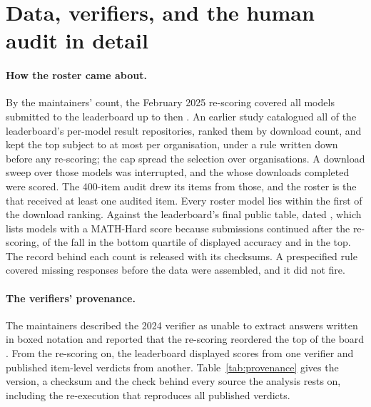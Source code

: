 \section{Data, verifiers, and the human audit in detail}
\label{app:data}

\paragraph{How the roster came about.}
By the maintainers' count, the February 2025 re-scoring covered all \BoardModelsRescored{} models
submitted to the leaderboard up to then \citep{kydlicek2025fixing}. An earlier study catalogued all \RosterCatalogued{} of the
leaderboard's per-model result repositories, ranked them by download count, and kept the top
\RosterSelected{} subject to at most \RosterMaxPerOrg{} per organisation, under a rule written
down before any re-scoring; the cap spread the selection over \RosterOrgs{} organisations. A
download sweep over those models was interrupted, and the \RosterScored{} whose downloads
completed were scored. The 400-item audit drew its items from those, and the
roster is the \NumModels{} that received at least one audited item. Every roster model lies
within the first \RosterDeepestRank{} of the download ranking. Against the leaderboard's final
public table, dated \BoardFinalTableDate{}, which lists \BoardModelsFinal{} models with a MATH-Hard
score because submissions continued after the re-scoring,
\RosterBottomQuartile{} of the \NumModels{} fall in the bottom quartile of displayed accuracy
and \RosterTopQuartile{} in the top. The record behind each count is released with its
checksums. A prespecified rule covered missing responses before the data were assembled, and it
did not fire.

\paragraph{The verifiers' provenance.}
The maintainers described the 2024 verifier as unable to extract answers written
in boxed notation and reported that the re-scoring reordered the top of the board
\citep{kydlicek2025fixing}. From the re-scoring on, the leaderboard displayed scores from one
verifier and published item-level verdicts from another. Table~\ref{tab:provenance} gives the
version, a checksum and the check behind every source the analysis rests on, including the
re-execution that reproduces all \EmReexecItems{} published verdicts.



